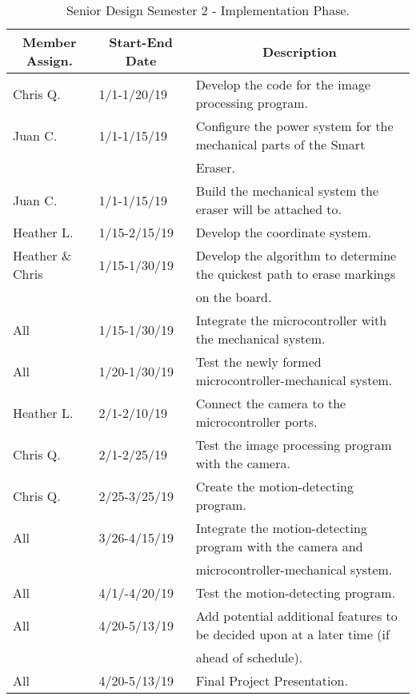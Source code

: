 \documentclass[10pt,onecolumn,draftclsnofoot]{IEEEtran} 					%
\begin{document}
	\setlength{\parindent}{5ex}
\begin{table} [H]	
\normalsize
	\centering
		\begin{tabular}{|l|l|l|}
			\hline
				\multicolumn{1}{|c|}{\textbf{Member Assign.}} & \multicolumn{1}{|c|}{\textbf{Start-End Date}} & \multicolumn{1}{|c|}{\textbf{Description}} \\
			\hline
				Chris Q. & 1/1-1/20/19 & Develop the code for the image processing program. \\
			\hline
				Juan C. & 1/1-1/15/19 & Configure the power system for the mechanical parts of the Smart \\
				& & Eraser. \\
			\hline
				Juan C. & 1/1-1/15/19 & Build the mechanical system the eraser will be attached to.\\
			\hline
				Heather L. & 1/15-2/15/19 & Develop the coordinate system. \\
			\hline
				Heather \& Chris & 1/15-1/30/19 & Develop the algorithm to determine the quickest path to erase markings \\
				& & on the board.\\
			\hline
				All & 1/15-1/30/19 & Integrate the microcontroller with the mechanical system.\\
			\hline
				All & 1/20-1/30/19 & Test the newly formed microcontroller-mechanical system.\\
			\hline
				Heather L. & 2/1-2/10/19 & Connect the camera to the microcontroller ports.\\
			\hline
				Chris Q. & 2/1-2/25/19 & Test the image processing program with the camera.\\
			\hline
				Chris Q. & 2/25-3/25/19 & Create the motion-detecting program.\\
			\hline
				All & 3/26-4/15/19 & Integrate the motion-detecting program with the camera and \\
				& & microcontroller-mechanical system.\\
			\hline
				All & 4/1/-4/20/19 & Test the motion-detecting program.\\
			\hline
				All & 4/20-5/13/19 & 
				Add potential additional features to be decided upon at a later time (if \\
				& & ahead of schedule).\\
			\hline
				All & 4/20-5/13/19 & 
				Final Project Presentation.\\
			\hline
	\end{tabular} 
		\caption{Senior Design Semester 2 - Implementation Phase.}
		\label{table:3}
\end{table}
	
\end{document}
